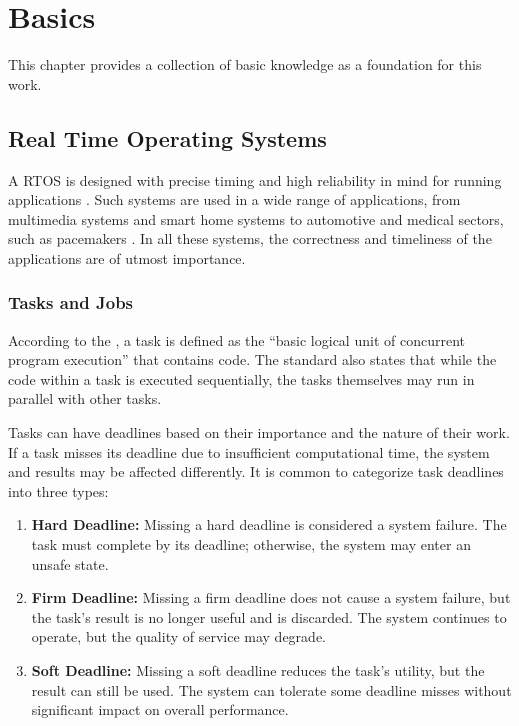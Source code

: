 \chapter{Basics}\label{ch:basics}
This chapter provides a collection of basic knowledge as a foundation for this work.

\section{Real Time Operating Systems}\label{sec:rtos}
A \ac{RTOS} is designed with precise timing and high reliability in mind for running applications \textcite{stankovicRealtimeOperatingSystems2004}.
Such systems are used in a wide range of applications, from multimedia systems and smart home systems to automotive and medical sectors, such as pacemakers \cite{hambardeSurveyRealTime2014}.
In all these systems, the correctness and timeliness of the applications are of utmost importance\cite{hambardeSurveyRealTime2014}.

\subsection{Tasks and Jobs}\label{sec:tasks_and_jobs}
According to the \textcite{IEEEStandardRealTime}, a task is defined as the ``basic logical unit of concurrent program execution'' that contains code. The standard also states that while the code within a task is executed sequentially, the tasks themselves may run in parallel with other tasks.

Tasks can have deadlines based on their importance and the nature of their work. If a task misses its deadline due to insufficient computational time, the system and results may be affected differently. It is common to categorize task deadlines into three types\cite{dengSchedulingRealtimeApplications1997,abeniIntegratingMultimediaApplications1998,shindeComparisonRealTime2017}:
\begin{enumerate}
	\item \textbf{Hard Deadline:}
	      Missing a hard deadline is considered a system failure. The task must complete by its deadline; otherwise, the system may enter an unsafe state.
	\item \textbf{Firm Deadline:}
	      Missing a firm deadline does not cause a system failure, but the task's result is no longer useful and is discarded. The system continues to operate, but the quality of service may degrade.
	\item \textbf{Soft Deadline:}
	      Missing a soft deadline reduces the task's utility, but the result can still be used. The system can tolerate some deadline misses without significant impact on overall performance.
\end{enumerate}

